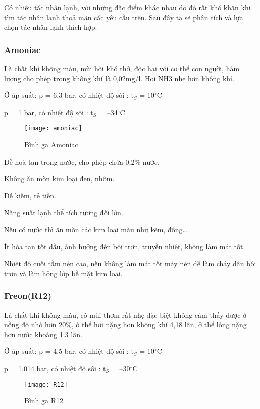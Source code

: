 Có nhiều tác nhân lạnh, với những đặc điểm khác nhau do đó rất khó khăn khi tìm tác nhân lạnh thoả mãn các yêu cầu trên. Sau đây ta sẽ phân tích và lựa chọn tác nhân lạnh thích hợp.

\subsubsection{Amoniac}
Là chất khí không màu, mùi hôi khó thở, độc hại với cơ thể con người, hàm lượng cho phép trong không khí là 0,02mg/l. Hơi NH3 nhẹ hơn không khí.

Ở áp suất: 
\hspace{1cm}
p = 6.3 bar, có nhiệt độ sôi : t$_{S}$ = 10$^{\circ}$C

\hspace{2.95cm}
p = 1 bar, có nhiệt độ sôi : t$_{S}$ = –34$^{\circ}$C
\begin{figure}[H]
	\centering
	\texttt{[image: amoniac]}
	\caption{Bình ga Amoniac}
\end{figure}

Dễ hoà tan trong nước, cho phép chứa 0,2\% nước.

Không ăn mòn kim loại đen, nhôm.

Dễ kiếm, rẻ tiền.

Năng suất lạnh thể tích tương đối lớn.

Nếu có nước thì ăn mòn các kim loại màu như kẽm, đồng…

Ít hòa tan tốt dầu, ảnh hưởng đến bôi trơn, truyền nhiệt, không làm mát tốt.

Nhiệt độ cuối tầm nén cao, nếu không làm mát tốt máy nén dễ làm cháy dầu bôi trơn và làm hỏng lớp bề mặt kim loại.
\subsubsection{Freon(R12)}
Là chất khí không màu, có mùi thơm rất nhẹ đặc biệt không cảm thấy được ở nồng độ nhỏ hơn 20\%, ở thể hơi nặng hơn không khí 4,18 lần, ở thể lỏng nặng hơn nước khoảng 1.3 lần.

Ở áp suất: 
\hspace{1cm}
p = 4.5 bar, có nhiệt độ sôi : t$_{S}$ = 10$^{\circ}$C

\hspace{2.95cm}
p = 1.014 bar, có nhiệt độ sôi : t$_{S}$ = –30$^{\circ}$C
\begin{figure}[H]
	\centering
	\texttt{[image: R12]}
	\caption{Bình ga R12}
\end{figure}

